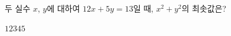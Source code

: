 두 실수 $x$, $y$에 대하여 $12x+5y=13$일 때, $x^2+y^2$의 최솟값은?
\begin{choices32}{$1$}{$2$}{$3$}{$4$}{$5$}\end{choices32}
